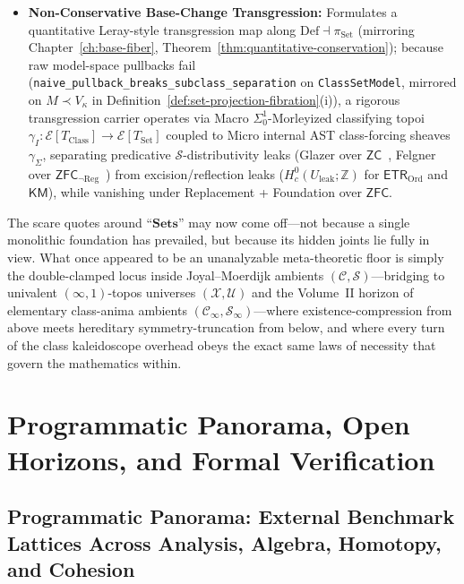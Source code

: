 \begin{itemize}
  \item \textbf{Non-Conservative Base-Change Transgression:} Formulates a quantitative Leray-style transgression map along $\mathrm{Def} \dashv \pi_{\mathrm{Set}}$ (mirroring Chapter~\ref{ch:base-fiber}, Theorem~\ref{thm:quantitative-conservation}); because raw model-space pullbacks fail (\texttt{naive\_pullback\_breaks\_subclass\_separation} on \texttt{ClassSetModel}, mirrored on $M \prec V_\kappa$ in Definition~\ref{def:set-projection-fibration}(i)), a rigorous transgression carrier operates via Macro $\Sigma^1_0$-Morleyized classifying topoi $\gamma_I : \mathcal{E}[T_{\mathrm{Class}}] \to \mathcal{E}[T_{\mathrm{Set}}]$ coupled to Micro internal AST class-forcing sheaves $\gamma_\Sigma$, separating predicative $\mathcal{S}$-distributivity leaks (Glazer over $\mathsf{ZC}$~\cite{Glazer23}, Felgner over $\mathsf{ZFC}_{\neg\mathrm{Reg}}$~\cite{Felgner76}) from excision/reflection leaks ($H^0_c(U_{\mathrm{leak}}; \mathbb{Z})$ for $\mathsf{ETR}_{\mathrm{Ord}}$ and $\mathsf{KM}$), while vanishing under Replacement + Foundation over $\mathsf{ZFC}$.
\end{itemize}

The scare quotes around ``$\mathbf{Sets}$'' may now come off---not because a single monolithic foundation has prevailed, but because its hidden joints lie fully in view. What once appeared to be an unanalyzable meta-theoretic floor is simply the double-clamped locus inside Joyal--Moerdijk ambients $(\mathcal{C}, \mathcal{S})$---bridging to univalent $(\infty, 1)$-topos universes $(\mathcal{X}, \mathcal{U})$ and the Volume~II horizon of elementary class-anima ambients $(\mathcal{C}_\infty, \mathcal{S}_\infty)$---where existence-compression from above meets hereditary symmetry-truncation from below, and where every turn of the class kaleidoscope overhead obeys the exact same laws of necessity that govern the mathematics within.

\part{Programmatic Panorama, Open Horizons, and Formal Verification}

\chapter{Programmatic Panorama: External Benchmark Lattices Across Analysis, Algebra, Homotopy, and Cohesion}

\label{ch:panorama}\label{ch:non-ac-lattices}

